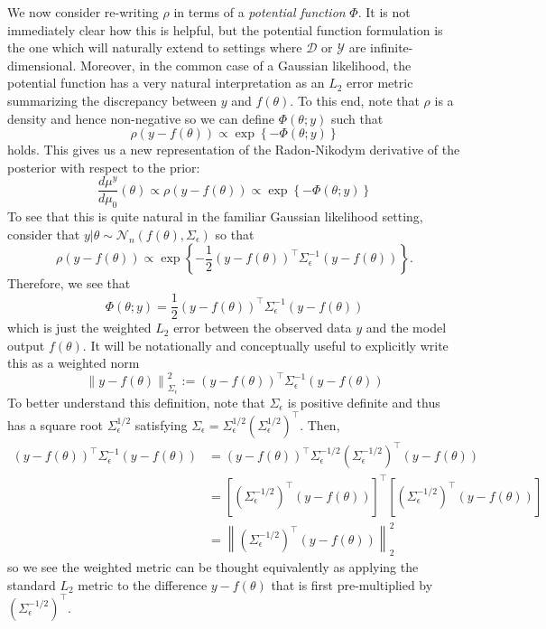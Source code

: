 \documentclass[12pt]{article}
\newcommand*{\norm}[1]{\left\lVert#1\right\rVert}
\begin{document}
We now consider re-writing $\rho$ in terms of a \textit{potential function} $\Phi$. It is not immediately clear how this is helpful, but the potential function formulation is the one which will naturally extend to settings
where $\mathcal{D}$ or $\mathcal{Y}$ are infinite-dimensional. Moreover, in the common case of a Gaussian likelihood, the potential function has a very natural interpretation as an $L_2$ error metric summarizing 
the discrepancy between $y$ and $f(\theta)$. To this end, note that $\rho$ is a density and hence non-negative so we can define $\Phi(\theta; y)$ such that
\[\rho(y - f(\theta)) \propto \exp\left\{-\Phi(\theta; y)\right\}\]
holds. This gives us a new representation of the Radon-Nikodym derivative of the posterior with respect to the prior:
\[\frac{d\mu^y}{d\mu_0}(\theta) \propto \rho(y - f(\theta)) \propto \exp\left\{-\Phi(\theta; y)\right\}\]
To see that this is quite natural in the familiar Gaussian likelihood setting, consider that $y|\theta \sim \mathcal{N}_n(f(\theta), \Sigma_\epsilon)$ so that 
\[\rho(y - f(\theta)) \propto  \exp\left\{-\frac{1}{2}(y - f(\theta))^{\top} \Sigma_\epsilon^{-1}(y - f(\theta))\right\}.\]
Therefore, we see that 
\[\Phi(\theta; y) = \frac{1}{2}(y - f(\theta))^{\top} \Sigma_\epsilon^{-1}(y - f(\theta))\]
which is just the weighted $L_2$ error between the observed data $y$ and the model output $f(\theta)$. It will be notationally and conceptually useful to explicitly write this as a weighted norm 
\[\norm{y - f(\theta)}^2_{\Sigma_{\epsilon}} := (y - f(\theta))^{\top} \Sigma_\epsilon^{-1}(y - f(\theta))\]
To better understand this definition, note that $\Sigma_\epsilon$ is positive definite and thus has a square root $\Sigma_\epsilon^{1/2}$ satisfying $\Sigma_\epsilon = \Sigma_\epsilon^{1/2} \left(\Sigma_\epsilon^{1/2}\right)^{\top}$. Then, 
\begin{align*}
(y - f(\theta))^{\top} \Sigma_\epsilon^{-1}(y - f(\theta)) &= (y - f(\theta))^{\top} \Sigma_\epsilon^{-1/2} \left(\Sigma_\epsilon^{-1/2}\right)^{\top}(y - f(\theta)) \\
									   &= \left[\left(\Sigma_\epsilon^{-1/2}\right)^{\top} (y - f(\theta)) \right]^{\top} \left[\left(\Sigma_\epsilon^{-1/2}\right)^{\top} (y - f(\theta)) \right] \\
									   &= \norm{\left(\Sigma_\epsilon^{-1/2}\right)^{\top} (y - f(\theta))}_2^2
\end{align*}
so we see the weighted metric can be thought equivalently as applying the standard $L_2$ metric to the difference $y - f(\theta)$ that is first pre-multiplied by $\left(\Sigma_\epsilon^{-1/2}\right)^{\top}$. 
\end{document}
